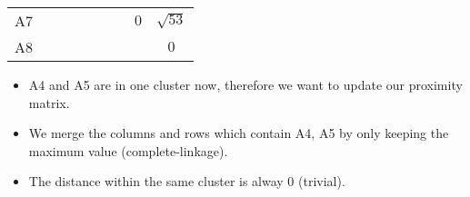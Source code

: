 \documentclass[aspectratio=169, 10pt]{beamer}
\begin{document}
\begin{frame}[t]
\begin{table}[]
\begin{tabular}{c|ccc|cc|ccc}
        A7                                              &     &             &             &                                    &                                    &                                   & $0$                                & $\sqrt{53}$                        \\
        A8                                              &     &             &             &                                    &                                    &                                   &                                    & $0$                               
        \end{tabular}
    \end{table}

    \begin{itemize}
        \item A4 and A5 are in one cluster now, therefore we want to update our proximity matrix.
        \item We merge the columns and rows which contain A4, A5 by only keeping the maximum value (complete-linkage).
        \item The distance within the same cluster is alway 0 (trivial). 
    \end{itemize}

\end{frame}
\end{document}
